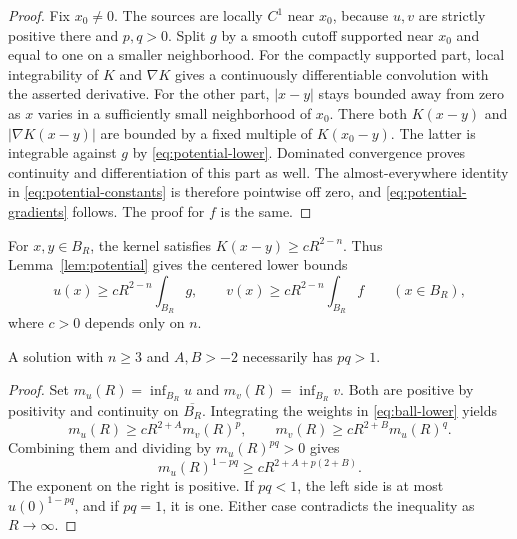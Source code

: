 \begin{proof}
Fix $x_0\ne0$.  The sources are locally $C^1$ near $x_0$, because $u,v$
are strictly positive there and $p,q>0$.  Split $g$ by a smooth cutoff
supported near $x_0$ and equal to one on a smaller neighborhood.  For
the compactly supported part, local integrability of $K$ and $\nabla K$
gives a continuously differentiable convolution with the asserted
derivative.  For the other part, $|x-y|$ stays bounded away from zero
as $x$ varies in a sufficiently small neighborhood of $x_0$.  There
both $K(x-y)$ and $|\nabla K(x-y)|$ are bounded by a fixed multiple of
$K(x_0-y)$.  The latter is integrable against $g$ by
\eqref{eq:potential-lower}.  Dominated convergence proves continuity
and differentiation of this part as well.  The almost-everywhere identity
in \eqref{eq:potential-constants} is therefore pointwise off zero, and
\eqref{eq:potential-gradients} follows.  The proof for $f$ is the same.
\end{proof}

For $x,y\in B_R$, the kernel satisfies $K(x-y)\ge cR^{2-n}$.  Thus
Lemma~\ref{lem:potential} gives the centered lower bounds
\begin{equation}\label{eq:ball-lower}
 u(x)\ge cR^{2-n}\int_{B_R}g,\qquad
 v(x)\ge cR^{2-n}\int_{B_R}f\qquad(x\in B_R),
\end{equation}
where $c>0$ depends only on $n$.

\begin{lemma}\label{lem:low-exponents}
A solution with $n\ge3$ and $A,B>-2$ necessarily has $pq>1$.
\end{lemma}

\begin{proof}
Set $m_u(R)=\inf_{B_R}u$ and $m_v(R)=\inf_{B_R}v$.  Both are positive
by positivity and continuity on $\overline{B_R}$.  Integrating the
weights in \eqref{eq:ball-lower} yields
\[
 m_u(R)\ge cR^{2+A}m_v(R)^p,\qquad
 m_v(R)\ge cR^{2+B}m_u(R)^q.
\]
Combining them and dividing by $m_u(R)^{pq}>0$ gives
\[
 m_u(R)^{1-pq}\ge cR^{2+A+p(2+B)}.
\]
The exponent on the right is positive.  If $pq<1$, the left side is
at most $u(0)^{1-pq}$, and if $pq=1$, it is one.  Either case contradicts
the inequality as $R\to\infty$.
\end{proof}

